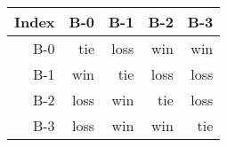 \begin{tabular}{ | r | r | r | r | r | }
    \hline
        Index  &    B-0  &    B-1  &    B-2  &    B-3  \\
    \hline
    \hline
          B-0  &    tie  &   loss  &    win  &    win  \\
    \hline
          B-1  &    win  &    tie  &   loss  &   loss  \\
    \hline
          B-2  &   loss  &    win  &    tie  &   loss  \\
    \hline
          B-3  &   loss  &    win  &    win  &    tie  \\
    \hline
\end{tabular}

